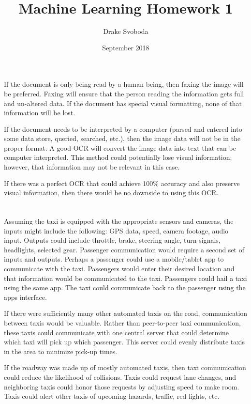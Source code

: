 \documentclass[12pt, letterpaper]{article}
\title{Machine Learning Homework 1}
\author{Drake Svoboda}
\date{September 2018}
\begin{document}
\maketitle

\section{} 
If the document is only being read by a human being, then faxing the image will be preferred. Faxing will ensure that the person reading the information gets full and un-altered data. If the document has special visual formatting, none of that information will be lost. 

If the document needs to be interpreted by a computer (parsed and entered into some data store, queried, searched, etc.), then the image data will not be in the proper format. A good OCR will convert the image data into text that can be computer interpreted. This method could potentially lose visual information; however, that information may not be relevant in this case.

If there was a perfect OCR that could achieve 100\% accuracy and also preserve visual information, then there would be no downside to using this OCR.

 
\section{}
Assuming the taxi is equipped with the appropriate sensors and cameras, the inputs might include the following: GPS data, speed, camera footage, audio input. Outputs could include throttle, brake, steering angle, turn signals, headlights, selected gear. Passenger communication would require a second set of inputs and outputs. Perhaps a passenger could use a mobile/tablet app to communicate with the taxi. Passengers would enter their desired location and that information would be communicated to the taxi. Passengers could hail a taxi using the same app. The taxi could communicate back to the passenger using the apps interface. 

If there were sufficiently many other automated taxis on the road, communication between taxis would be valuable. Rather than peer-to-peer taxi communication, these taxis could communicate with one central server that could determine which taxi will pick up which passenger. This server could evenly distribute taxis in the area to minimize pick-up times. 

If the roadway was made up of mostly automated taxis, then taxi communication could reduce the likelihood of collisions. Taxis could request lane changes, and neighboring taxis could honor those requests by adjusting speed to make room. Taxis could alert other taxis of upcoming hazards, traffic, red lights, etc.
\end{document}
